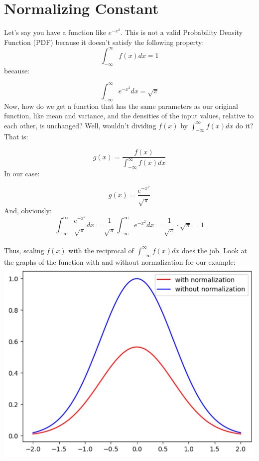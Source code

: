 \documentclass{article}
\begin{document}
\section*{Normalizing Constant}

Let's say you have a function like $e^{-x^2}$. This is not a valid Probability Density Function (PDF) because it doesn't satisfy the following property: 
\[\int_{-\infty}^{\infty}f(x)dx=1\]
because:

\[\int_{-\infty}^{\infty}e^{-x^2}dx=\sqrt{\pi}\]
Now, how do we get a function that has the same parameters as our original function, like mean and variance, and the densities of the input values, relative to each other, is unchanged? Well, wouldn't dividing $f(x)$ by $\int_{-\infty}^{\infty}f(x)dx$ do it? That is:

\[g(x)=\frac{f(x)}{\int_{-\infty}^{\infty}f(x)dx}\]
In our case:

\[g(x)=\frac{e^{-x^2}}{\sqrt{\pi}}\]
And, obviously:
\[\int_{-\infty}^{\infty}\frac{e^{-x^2}}{\sqrt{\pi}}dx=\frac{1}{\sqrt{\pi}}\int_{-\infty}^{\infty}e^{-x^2}dx=\frac{1}{\sqrt{\pi}}\cdot\sqrt{\pi}=1\]
\\Thus, scaling $f(x)$ with the reciprocal of $\int_{-\infty}^{\infty}f(x)dx$ does the job. Look at the graphs of the function with and without normalization for our example:\\

\includegraphics[scale=0.3]{graph}
\centering
\end{document}
